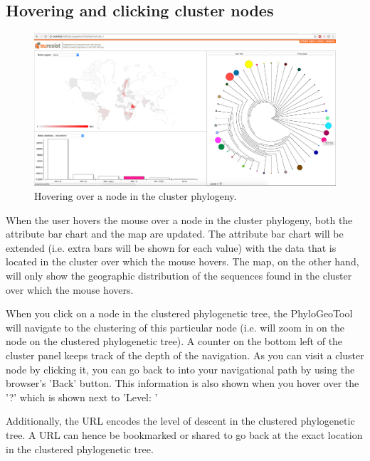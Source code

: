 \documentclass[a4paper, 11pt]{article} %
\begin{document}
\subsection{Hovering and clicking cluster nodes}
\begin{figure}[H]
\centering
\includegraphics[scale=0.1875]{images/hover_node.PNG}
\vspace{-0.75cm}
\caption{Hovering over a node in the cluster phylogeny.}
\label{fig:hovernode}
\end{figure}

When the user hovers the mouse over a node in the cluster phylogeny, both the attribute bar chart and the map are updated. 
The attribute bar chart will be extended (i.e. extra bars will be shown for each value) with the data that is located in the cluster over which the mouse hovers. %
The map, on the other hand, will only show the geographic distribution of the sequences found in the cluster over which the mouse hovers.

When you click on a node in the clustered phylogenetic tree, the PhyloGeoTool will navigate to the clustering of this particular node (i.e. will zoom in on the node on the clustered phylogenetic tree).
A counter on the bottom left of the cluster panel keeps track of the depth of the navigation. 
As you can visit a cluster node by clicking it, you can go back to into your navigational path by using the browser’s ’Back’ button.
This information is also shown when you hover over the '?' which is shown next to 'Level: '

Additionally, the URL encodes the level of descent in the clustered phylogenetic tree. 
A URL can hence be bookmarked or shared to go back at the exact location in the clustered phylogenetic tree. 
\end{document}
